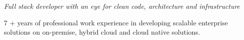 \noindent \emph{Full stack developer with  an eye for clean code, architecture and infrastructure}

7 + years of professional work experience in developing scalable enterprise solutions on on-premise, hybrid cloud and cloud native solutions. 